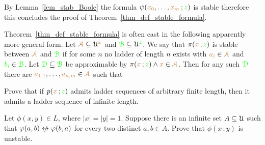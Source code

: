 


By Lemma~\ref{lem_stab_Boole} the formula $\psi({\color{brown} x_0},\dots,{\color{brown} x_m}\,;{\color{green} z})$ is stable therefore this concludes the proof of Theorem~\ref{thm_def_stable_formula}.

\begin{remark}\label{rem_sability_no_compactness}
  Theorem~\ref{thm_def_stable_formula} is often cast in the following  apparently more general form.
  Let ${\color{brown}\EuScript A}\subseteq\EuScript U^{\color{brown} x}$ and ${\color{green}\EuScript B}\subseteq\EuScript U^{\color{green} z}$.
  We say that $\pi({\color{brown} x}\,;{\color{green} z})$ is stable between ${\color{brown}\EuScript A}$ and ${\color{green}\EuScript B}$ if for some $n$ no ladder of length $n$ exists with ${\color{brown} a_i}\in{\color{brown}\EuScript A}$ and ${\color{green} b_i}\in{\color{green}\EuScript B}$.
  Let ${\color{green}\EuScript D}\subseteq{\color{green}\EuScript B}$ be approximable by $\pi({\color{brown} x}\,;{\color{green} z})\wedge {\color{brown}x}\in{\color{brown}\EuScript A}$.
  Then for any such ${\color{green}\EuScript D}$ there are ${\color{brown} a_{1,1}},\dots,{\color{brown} a_{n,m}}\in {\color{brown}\EuScript A}$ such that 
  
\end{remark} 


\begin{exercise}
  Prove that if $p({\color{brown} x}\,;{\color{green} z})$ admits ladder sequences of arbitrary finite length, then it admits a ladder sequence of infinite length.
\end{exercise}

\begin{exercise}
  Let $\phi(x,y)\in  L$, where $|x|=|y|=1$.
  Suppose there is an infinite set $A\subseteq\EuScript U$ such that $\phi(a,b)\niff\phi(b,a)$ for every two distinct $a,b\in A$.
  Prove that $\phi(x\,;y)$ is unstable.
\end{exercise}


